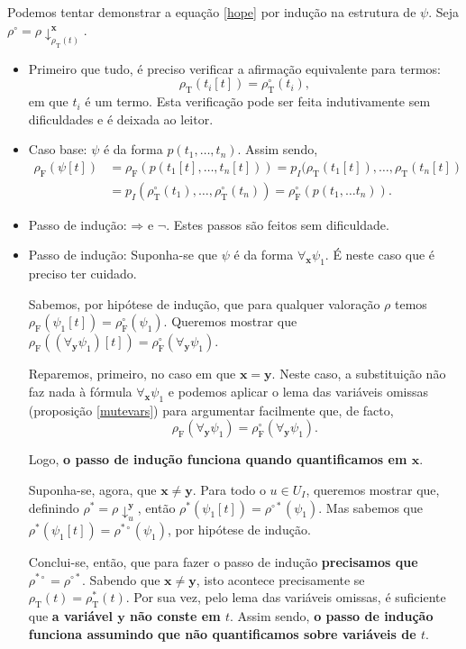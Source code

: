 \documentclass{report}
\theoremstyle{definition}
\theoremstyle{remark}
\renewcommand{\bf}[1]{\mathbf{#1}}
\newcommand{\F}{\mathrm{F}}
\newcommand{\T}{\mathrm{T}}
\newcommand{\imply}{\mathbin{\Rightarrow}}
\begin{document}
	Podemos tentar demonstrar a equação \eqref{hope} por indução na estrutura de $\psi$. Seja $\rho^\circ = \rho\!\downarrow^{\bf x}_{\rho_\T(t)}$.

	\begin{itemize}
	\item Primeiro que tudo, é preciso verificar a afirmação equivalente para termos:
\[\rho_\T(t_i[t]) = \rho^\circ_\T(t_i),\]
	em que $t_i$ é um termo. Esta verificação pode ser feita indutivamente sem dificuldades e é deixada ao leitor.

	\item Caso base: $\psi$ é da forma $p(t_1, \dots, t_n)$. Assim sendo,
\begin{align*}
\rho_\F(\psi[t]) &= \rho_\F(p(t_1[t], \dots, t_n[t])) = p_I(\rho_\T(t_1[t]), \dots, \rho_\T(t_n[t])\\
&= p_I(\rho^\circ_\T(t_1), \dots, \rho^\circ_\T(t_n)) = \rho^\circ_\F(p(t_1, \dots t_n)).
\end{align*}

	\item Passo de indução: $\imply$ e $\neg$. Estes passos são feitos sem dificuldade.

	\item Passo de indução: Suponha-se que $\psi$ é da forma $\forall_{\bf x} \psi_1$. É neste caso que é preciso ter cuidado.

	Sabemos, por hipótese de indução, que para qualquer valoração $\rho$ temos $\rho_\F(\psi_1[t]) = \rho^\circ_\F(\psi_1)$. Queremos mostrar que $\rho_\F(\left(\forall_{\bf y} \psi_1\right)[t]) = \rho^\circ_\F(\forall_{\bf y} \psi_1)$.

	Reparemos, primeiro, no caso em que $\bf x = \bf y$. Neste caso, a substituição não faz nada à fórmula $\forall_{\bf x} \psi_1$ e podemos aplicar o lema das variáveis omissas (proposição \ref{mutevars}) para argumentar facilmente que, de facto,
\[\rho_\F(\forall_{\bf y} \psi_1) = \rho^\circ_\F(\forall_{\bf y} \psi_1).\]

	Logo, \textbf{o passo de indução funciona quando quantificamos em $\bf x$}.

	Suponha-se, agora, que $\bf x \neq \bf y$. Para todo o $u \in U_I$, queremos mostrar que, definindo $\rho^* = \rho\!\downarrow^{\bf y}_u$, então $\rho^*(\psi_1[t]) = \rho^{\circ *}(\psi_1)$. Mas sabemos que $\rho^*(\psi_1[t]) = \rho^{* \circ}(\psi_1)$, por hipótese de indução.

	Conclui-se, então, que para fazer o passo de indução \textbf{precisamos que $\rho^{*\circ} = \rho^{\circ *}$}. Sabendo que $\bf x \neq \bf y$, isto acontece precisamente se $\rho_\T(t) = \rho^*_\T(t)$. Por sua vez, pelo lema das variáveis omissas, é suficiente que \textbf{a variável $\bf y$ não conste em $t$}. Assim sendo, \textbf{o passo de indução funciona assumindo que não quantificamos sobre variáveis de $t$}.


\end{itemize}
\end{document}
